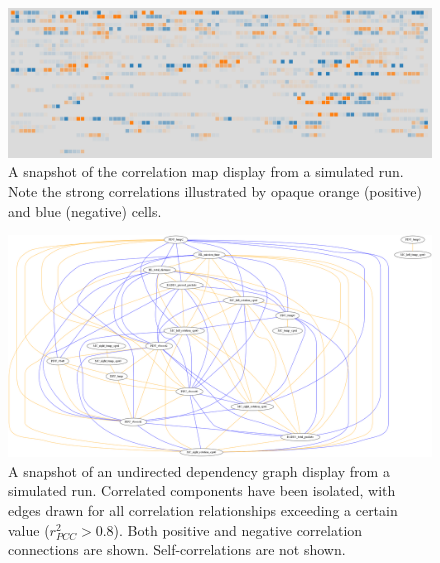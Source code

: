 \begin{figure}[h]
\centering
    \includegraphics[width=\columnwidth]{images/comparison_correlation_map.png}
    \caption{A snapshot of the correlation map display from a simulated run. Note the strong correlations illustrated by opaque orange (positive) and blue (negative) cells.}
    \label{fig:comparison_correlation_map}
\end{figure}

\begin{figure}[h]
\centering
    \includegraphics[width=\columnwidth]{images/undirected_both.png}
    \caption{A snapshot of an undirected dependency graph display from a simulated run. Correlated components have been isolated, with edges drawn for all correlation relationships exceeding a certain value ($r_{PCC}^{2} > 0.8$). Both positive and negative correlation connections are shown. Self-correlations are not shown.}
    \label{fig:undirected_both}
\end{figure}

